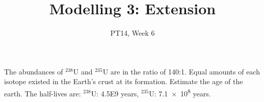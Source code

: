 \documentclass{article}
\title{Modelling 3: Extension}
\date{PT14, Week 6}
\begin{document}
\maketitle\thispagestyle{empty}
            The abundances of $^{238}$U and $^{235}$U are in the ratio of 140:1. Equal amounts of each isotope existed in the Earth's crust at its formation. Estimate the age of the earth. The half-lives are: $^{238}$U: \num{4.5E9} years, $^{235}$U: \num{7.1e8} years.
\end{document}
